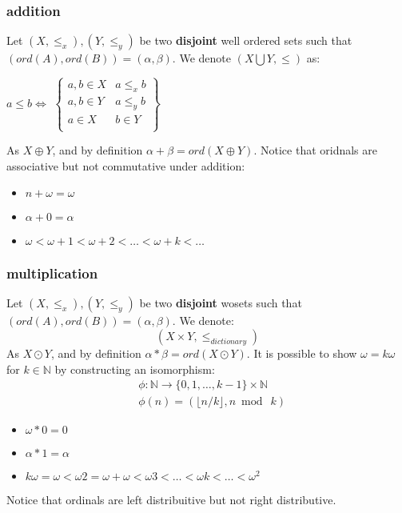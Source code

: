 \documentclass{article}
\newcommand{\N}{\mathbb{N}}
\theoremstyle{plain}
\begin{document}
	\subsubsection{addition}
	Let $(X,\le_x),(Y,\le_y)$ be two \textbf{disjoint} well ordered sets such 
	that $(ord(A),ord(B)) = (\alpha,\beta)$. 
	We denote $\left(X \bigcup Y,\le \right)$ as:
	\begin{center}
		$a\le b \iff$ 
		$\begin{Bmatrix}
		a,b\in X & a\le_x b\\
		a,b\in Y & a\le_y b\\
		a\in X & b\in Y\\
	\end{Bmatrix}$
	\end{center}
	As $X\oplus Y$, and by definition $\alpha + \beta = ord(X\oplus Y)$.
	Notice that oridnals are associative but not commutative under addition:
	\begin{itemize}
		\item $n+\omega=\omega$
		\item $\alpha+0=\alpha$
		\item $\omega<\omega+1<\omega+2<\ldots<\omega+k<\ldots$
	\end{itemize}
	\subsubsection{multiplication}
	Let $(X,\le_x),(Y,\le_y)$ be two \textbf{disjoint} wosets such that 
	$(ord(A),ord(B)) = (\alpha,\beta)$. We denote:
	\[
		(X\times Y,\le_{dictionary})
	\]
	As $X \odot Y$, and by definition $\alpha * \beta = ord(X \odot Y)$.
	It is possible to show $\omega = k\omega$ for $k \in \N$ by constructing 
	an isomorphism:
	\begin{align*}
		&\phi \colon \N \rightarrow \{0, 1, \ldots, k-1\} \times \N \\
		&\phi(n)=(\lfloor{n/k}\rfloor,n \bmod \ k)
	\end{align*}

	\begin{itemize}
	\item $\omega*0=0$
	\item $\alpha*1=\alpha$
	\item $k\omega=\omega<\omega 2=\omega+\omega<\omega 3 
	<\ldots<\omega k<\ldots<\omega^2$
	\end{itemize}
	Notice that ordinals are left distribuitive but not right distributive.
\end{document}
